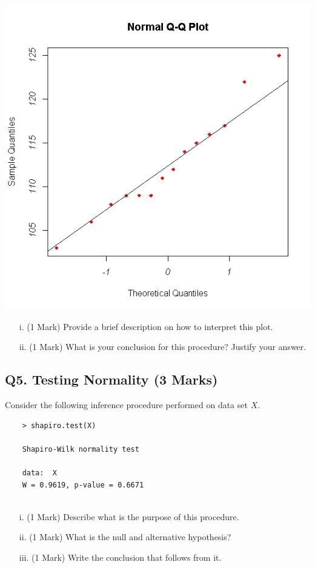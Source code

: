 \documentclass[a4paper,12pt]{article}
\begin{document}
\begin{center}
	\includegraphics[scale=0.45]{images/Q5examQQplot}
\end{center}

\begin{itemize}
	\item[i.] (1 Mark) Provide a brief description on how to interpret this plot.
	\item[ii.] (1 Mark) What is your conclusion for this procedure? Justify your answer.
\end{itemize}
\newpage
\subsection*{Q5. Testing Normality (3 Marks)} %
Consider the following inference procedure performed on data set $X$.
\begin{center}
	\begin{verbatim}
	> shapiro.test(X)
	
	Shapiro-Wilk normality test
	
	data:  X
	W = 0.9619, p-value = 0.6671
	
	\end{verbatim}
\end{center}


\begin{itemize}
	\item[i.] (1 Mark) Describe what is the purpose of this procedure.
	\item[ii.] (1 Mark) What is the null and alternative hypothesis?
	\item[iii.] (1 Mark) Write the conclusion that follows from it.
\end{itemize}
\end{document}
